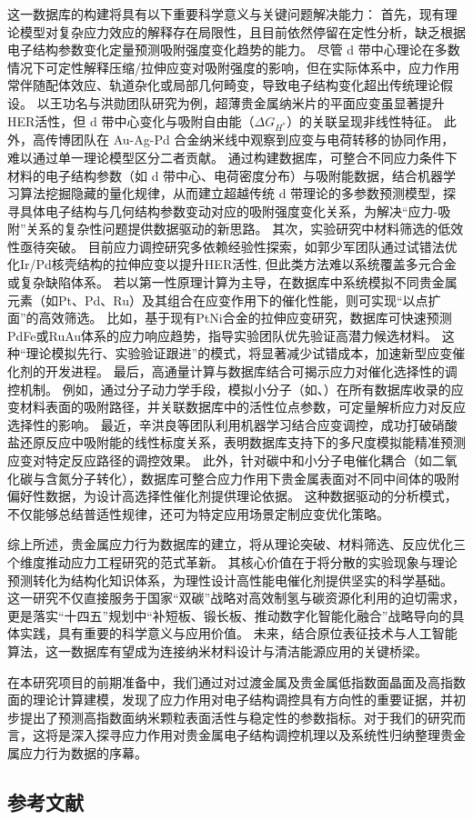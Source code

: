 这一数据库的构建将具有以下重要科学意义与关键问题解决能力：
首先，现有理论模型对复杂应力效应的解释存在局限性，且目前依然停留在定性分析，缺乏根据电子结构参数变化定量预测吸附强度变化趋势的能力。
尽管 d 带中心理论在多数情况下可定性解释压缩/拉伸应变对吸附强度的影响\cite{Hammer_1995}，但在实际体系中，应力作用常伴随配体效应、轨道杂化或局部几何畸变，导致电子结构变化超出传统理论假设。
以王功名与洪勋团队研究为例，超薄贵金属纳米片的平面应变虽显著提升HER活性，但 d 带中心变化与吸附自由能（$\Delta G_{H^{*}}$）的关联呈现非线性特征\cite{Wu_2022}。
此外，高传博团队在 Au-Ag-Pd 合金纳米线中观察到应变与电荷转移的协同作用，难以通过单一理论模型区分二者贡献\cite{Zhang_2021}。
通过构建数据库，可整合不同应力条件下材料的电子结构参数（如 d 带中心、电荷密度分布）与吸附能数据，结合机器学习算法挖掘隐藏的量化规律，从而建立超越传统 d 带理论的多参数预测模型，探寻具体电子结构与几何结构参数变动对应的吸附强度变化关系，为解决``应力-吸附''关系的复杂性问题提供数据驱动的新思路。
其次，实验研究中材料筛选的低效性亟待突破。
目前应力调控研究多依赖经验性探索，如郭少军团队通过试错法优化Ir/Pd核壳结构的拉伸应变以提升HER活性\cite{Guo_2023a},
但此类方法难以系统覆盖多元合金或复杂缺陷体系\cite{Yao_2023}。
若以第一性原理计算为主导，在数据库中系统模拟不同贵金属元素（如Pt、Pd、Ru）及其组合在应变作用下的催化性能，则可实现``以点扩面''的高效筛选。
比如，基于现有PtNi合金的拉伸应变研究\cite{Zhao_2020}，数据库可快速预测PdFe或RuAu体系的应力响应趋势，指导实验团队优先验证高潜力候选材料。
这种``理论模拟先行、实验验证跟进''的模式，将显著减少试错成本，加速新型应变催化剂的开发进程。
最后，高通量计算与数据库结合可揭示应力对催化选择性的调控机制。
例如，通过分子动力学手段，模拟小分子（如、）在所有数据库收录的应变材料表面的吸附路径，并关联数据库中的活性位点参数，可定量解析应力对反应选择性的影响。
最近，辛洪良等团队利用机器学习结合应变调控，成功打破硝酸盐还原反应中吸附能的线性标度关系\cite{Gao_2022}，表明数据库支持下的多尺度模拟能精准预测应变对特定反应路径的调控效果。
此外，针对碳中和小分子电催化耦合（如二氧化碳与含氮分子转化\cite{Liu_2022}），数据库可整合应力作用下贵金属表面对不同中间体的吸附偏好性数据，为设计高选择性催化剂提供理论依据。
这种数据驱动的分析模式，不仅能够总结普适性规律，还可为特定应用场景定制应变优化策略。

综上所述，贵金属应力行为数据库的建立，将从理论突破、材料筛选、反应优化三个维度推动应力工程研究的范式革新。
其核心价值在于将分散的实验现象与理论预测转化为结构化知识体系，为理性设计高性能电催化剂提供坚实的科学基础。
这一研究不仅直接服务于国家“双碳”战略对高效制氢与碳资源化利用的迫切需求，更是落实“十四五”规划中“补短板、锻长板、推动数字化智能化融合”战略导向的具体实践，具有重要的科学意义与应用价值。
未来，结合原位表征技术与人工智能算法，这一数据库有望成为连接纳米材料设计与清洁能源应用的关键桥梁。

在本研究项目的前期准备中，我们通过对过渡金属及贵金属低指数面晶面及高指数面的理论计算建模，发现了应力作用对电子结构调控具有方向性的重要证据\cite{Wu_2020}，并初步提出了预测高指数面纳米颗粒表面活性与稳定性的参数指标\cite{Wu_2021}。对于我们的研究而言，这将是深入探寻应力作用对贵金属电子结构调控机理以及系统性归纳整理贵金属应力行为数据的序幕。

\begin{REF}
	\subsection*{参考文献}
	\vspace{-50pt}
\end{REF}

\newpage%
